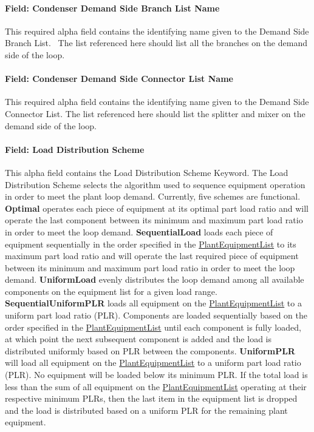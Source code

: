 \paragraph{Field: Condenser Demand Side Branch List Name}\label{field-condenser-demand-side-branch-list-name}

This required alpha field contains the identifying name given to the Demand Side Branch List.~ The list referenced here should list all the branches on the demand side of the loop.

\paragraph{Field: Condenser Demand Side Connector List Name}\label{field-condenser-demand-side-connector-list-name}

This required alpha field contains the identifying name given to the Demand Side Connector List. The list referenced here should list the splitter and mixer on the demand side of the loop.

\paragraph{Field: Load Distribution Scheme}\label{field-load-distribution-scheme-1-000}

This alpha field contains the Load Distribution Scheme Keyword. The Load Distribution Scheme selects the algorithm used to sequence equipment operation in order to meet the plant loop demand. Currently, five schemes are functional. \textbf{Optimal} operates each piece of equipment at its optimal part load ratio and will operate the last component between its minimum and maximum part load ratio in order to meet the loop demand. \textbf{SequentialLoad} loads each piece of equipment sequentially in the order specified in the \hyperref[plantequipmentlist]{PlantEquipmentList} to its maximum part load ratio and will operate the last required piece of equipment between its minimum and maximum part load ratio in order to meet the loop demand. \textbf{UniformLoad} evenly distributes the loop demand among all available components on the equipment list for a given load range. \textbf{SequentialUniformPLR} loads all equipment on the \hyperref[plantequipmentlist]{PlantEquipmentList} to a uniform part load ratio (PLR). Components are loaded sequentially based on the order specified in the \hyperref[plantequipmentlist]{PlantEquipmentList} until each component is fully loaded, at which point the next subsequent component is added and the load is distributed uniformly based on PLR between the components. \textbf{UniformPLR} will load all equipment on the \hyperref[plantequipmentlist]{PlantEquipmentList} to a uniform part load ratio (PLR). No equipment will be loaded below its minimum PLR. If the total load is less than the sum of all equipment on the \hyperref[plantequipmentlist]{PlantEquipmentList} operating at their respective minimum PLRs, then the last item in the equipment list is dropped and the load is distributed based on a uniform PLR for the remaining plant equipment.

